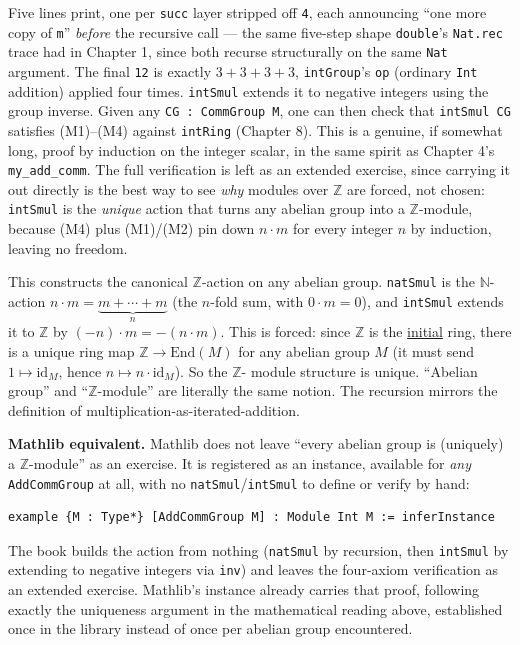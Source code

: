 Five lines print, one per \texttt{succ} layer stripped off \texttt{4}, each announcing ``one more copy of \texttt{m}'' \emph{before} the recursive call --- the same five-step shape \texttt{double}'s \texttt{Nat.rec} trace had in Chapter 1, since both recurse structurally on the same \texttt{Nat} argument. The final \texttt{12} is exactly \(3+3+3+3\), \texttt{intGroup}'s \texttt{op} (ordinary \texttt{Int} addition) applied four times. \texttt{intSmul} extends it to negative integers using the group inverse. Given any \texttt{CG : CommGroup M}, one can then check that \texttt{intSmul CG} satisfies (M1)--(M4) against \texttt{intRing} (Chapter 8). This is a genuine, if somewhat long, proof by induction on the integer scalar, in the same spirit as Chapter 4's \texttt{my\_\allowbreak{}add\_\allowbreak{}comm}. The full verification is left as an extended exercise, since carrying it out directly is the best way to see \emph{why} modules over \(\mathbb{Z}\) are forced, not chosen: \texttt{intSmul} is the \emph{unique} action that turns any abelian group into a \(\mathbb{Z}\)-module, because (M4) plus (M1)/(M2) pin down \(n \cdot m\) for every integer \(n\) by induction, leaving no freedom.

\begin{mathreading}

This constructs the canonical \(\mathbb{Z}\)-action on any abelian group. \texttt{natSmul} is the \(\mathbb{N}\)-action \(n\cdot m = \underbrace{m + \cdots + m}_{n}\) (the \(n\)-fold sum, with \(0\cdot m = 0\)), and \texttt{intSmul} extends it to \(\mathbb{Z}\) by \((-n)\cdot m = -(n\cdot m)\). This is forced: since \(\mathbb{Z}\) is the \hyperref[sec:01-basics:04-terminology:1]{initial} ring, there is a unique ring map \(\mathbb{Z} \to
\mathrm{End}(M)\) for any abelian group \(M\) (it must send \(1 \mapsto
\mathrm{id}_M\), hence \(n \mapsto n\cdot\mathrm{id}_M\)). So the \(\mathbb{Z}\)- module structure is unique. ``Abelian group'' and ``\(\mathbb{Z}\)-module'' are literally the same notion. The recursion mirrors the definition of multiplication-as-iterated-addition.

\end{mathreading}

\textbf{Mathlib equivalent.} Mathlib does not leave ``every abelian group is (uniquely) a \(\mathbb{Z}\)-module'' as an exercise. It is registered as an instance, available for \emph{any} \texttt{AddCommGroup} at all, with no \texttt{natSmul}/\texttt{intSmul} to define or verify by hand:

\begin{lstlisting}
example {M : Type*} [AddCommGroup M] : Module Int M := inferInstance
\end{lstlisting}

The book builds the action from nothing (\texttt{natSmul} by recursion, then \texttt{intSmul} by extending to negative integers via \texttt{inv}) and leaves the four-axiom verification as an extended exercise. Mathlib's instance already carries that proof, following exactly the uniqueness argument in the mathematical reading above, established once in the library instead of once per abelian group encountered.
